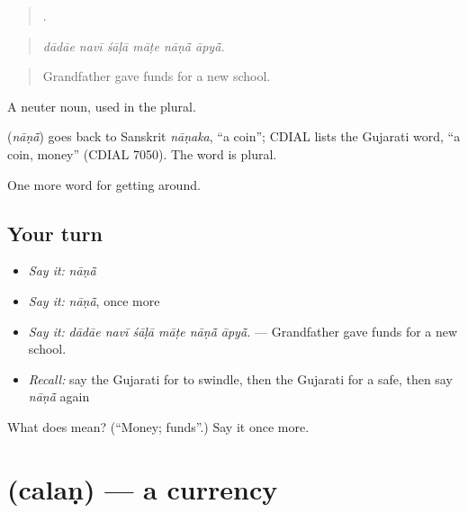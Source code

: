 \begin{quote}
     .
\end{quote}

\begin{quote}
\emph{dādāe navī śāḷā māṭe nāṇā̃ āpyā̃.}
\end{quote}

\begin{quote}
Grandfather gave funds for a new school.
\end{quote}

A neuter noun, used in the plural.

\begin{cousinweb}
\textbf{} (\emph{nāṇā̃}) goes back to Sanskrit \emph{nāṇaka}, \textquotedblleft{}a coin\textquotedblright{}; CDIAL lists the Gujarati word, \textquotedblleft{}a coin, money\textquotedblright{} (CDIAL 7050). The word is plural.
\end{cousinweb}

\begin{grammarlens}[title={What you've built}]
One more word for getting around.
\end{grammarlens}

\subsection*{Your turn}
\begin{itemize}
\raggedright
  \item \emph{Say it:} \emph{nāṇā̃}
  \item \emph{Say it:} \emph{nāṇā̃}, once more
  \item \emph{Say it:} \emph{dādāe navī śāḷā māṭe nāṇā̃ āpyā̃.} — Grandfather gave funds for a new school.
  \item \emph{Recall:} say the Gujarati for to swindle, then the Gujarati for a safe, then say \emph{nāṇā̃} again
\end{itemize}

\begin{tcolorbox}[breakable,colback=teal!4,colframe=teal!35!black,title={Before you move on}]
What does  mean? (\textquotedblleft{}Money; funds\textquotedblright{}.) Say it once more.
\end{tcolorbox}
\section[\texorpdfstring{\gu{ચલણ} (calaṇ)}{ચલણ (calaṇ)}]{ (calaṇ) — a currency}

